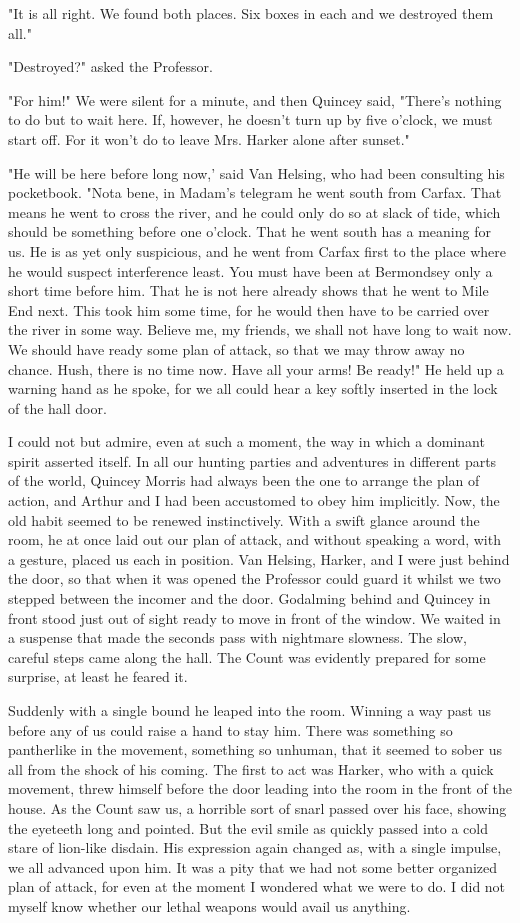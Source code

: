 "It is all right. We found both places. Six boxes in each and we destroyed them all." 

"Destroyed?" asked the Professor. 

"For him!" We were silent for a minute, and then Quincey said, "There's nothing to do but to wait here. If, however, he doesn't turn up by five o'clock, we must start off. For it won't do to leave Mrs. Harker alone after sunset." 

"He will be here before long now,' said Van Helsing, who had been consulting his pocketbook. "Nota bene, in Madam's telegram he went south from Carfax. That means he went to cross the river, and he could only do so at slack of tide, which should be something before one o'clock. That he went south has a meaning for us. He is as yet only suspicious, and he went from Carfax first to the place where he would suspect interference least. You must have been at Bermondsey only a short time before him. That he is not here already shows that he went to Mile End next. This took him some time, for he would then have to be carried over the river in some way. Believe me, my friends, we shall not have long to wait now. We should have ready some plan of attack, so that we may throw away no chance. Hush, there is no time now. Have all your arms! Be ready!" He held up a warning hand as he spoke, for we all could hear a key softly inserted in the lock of the hall door. 

I could not but admire, even at such a moment, the way in which a dominant spirit asserted itself. In all our hunting parties and adventures in different parts of the world, Quincey Morris had always been the one to arrange the plan of action, and Arthur and I had been accustomed to obey him implicitly. Now, the old habit seemed to be renewed instinctively. With a swift glance around the room, he at once laid out our plan of attack, and without speaking a word, with a gesture, placed us each in position. Van Helsing, Harker, and I were just behind the door, so that when it was opened the Professor could guard it whilst we two stepped between the incomer and the door. Godalming behind and Quincey in front stood just out of sight ready to move in front of the window. We waited in a suspense that made the seconds pass with nightmare slowness. The slow, careful steps came along the hall. The Count was evidently prepared for some surprise, at least he feared it. 

Suddenly with a single bound he leaped into the room. Winning a way past us before any of us could raise a hand to stay him. There was something so pantherlike in the movement, something so unhuman, that it seemed to sober us all from the shock of his coming. The first to act was Harker, who with a quick movement, threw himself before the door leading into the room in the front of the house. As the Count saw us, a horrible sort of snarl passed over his face, showing the eyeteeth long and pointed. But the evil smile as quickly passed into a cold stare of lion-like disdain. His expression again changed as, with a single impulse, we all advanced upon him. It was a pity that we had not some better organized plan of attack, for even at the moment I wondered what we were to do. I did not myself know whether our lethal weapons would avail us anything. 

